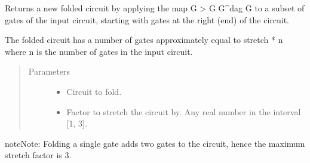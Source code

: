 \documentclass[letterpaper,10pt,english]{sphinxmanual}
\begin{document}
\begin{fulllineitems}
\label{\detokenize{index:mitiq.folding_cirq.fold_gates_from_right}}
Returns a new folded circuit by applying the map G \sphinxhyphen{}\textgreater{} G G\textasciicircum{}dag G to a subset of gates of the input circuit,
starting with gates at the right (end) of the circuit.

The folded circuit has a number of gates approximately equal to stretch * n where n is the number of gates in
the input circuit.
\begin{quote}\begin{description}
\item[{Parameters}] \leavevmode\begin{itemize}
\item {} 
 \sphinxhyphen{}\sphinxhyphen{} Circuit to fold.

\item {} 
 \sphinxhyphen{}\sphinxhyphen{} Factor to stretch the circuit by. Any real number in the interval {[}1, 3{]}.

\end{itemize}

\end{description}\end{quote}

\begin{sphinxadmonition}{note}{Note:}
Folding a single gate adds two gates to the circuit, hence the maximum stretch factor is 3.
\end{sphinxadmonition}

\end{fulllineitems}

\end{document}
